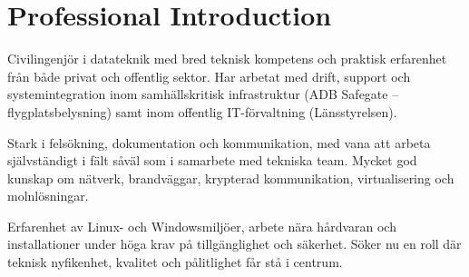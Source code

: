 \section*{Professional Introduction}

Civilingenjör i datateknik med bred teknisk kompetens och praktisk erfarenhet från både privat och offentlig sektor. Har arbetat med drift, support och systemintegration inom samhällskritisk infrastruktur (ADB Safegate – flygplatsbelysning) samt inom offentlig IT-förvaltning (Länsstyrelsen). 

Stark i felsökning, dokumentation och kommunikation, med vana att arbeta självständigt i fält såväl som i samarbete med tekniska team. Mycket god kunskap om nätverk, brandväggar, krypterad kommunikation, virtualisering och molnlösningar. 

Erfarenhet av Linux- och Windowsmiljöer, arbete nära hårdvaran och installationer under höga krav på tillgänglighet och säkerhet. Söker nu en roll där teknisk nyfikenhet, kvalitet och pålitlighet får stå i centrum.

